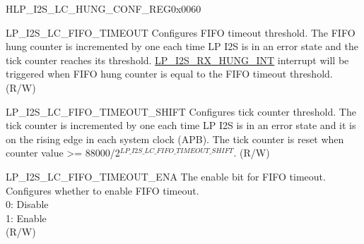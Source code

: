 \begin{register}{H}{LP\_I2S\_LC\_HUNG\_CONF\_REG}{0x0060}\label{regdesc:LPI2SLCHUNGCONFREG}
%
%
%
%
\regnewline%
\begin{regdesc}\begin{reglist}
\label{fielddesc:LPI2SLCFIFOTIMEOUT}\item[LP\_I2S\_LC\_FIFO\_TIMEOUT] Configures FIFO timeout threshold. The FIFO hung counter is incremented by one each time LP I2S is in an error state and the tick counter reaches its threshold. \hyperref[int:LPI2SRXHUNGINT]{LP\_I2S\_RX\_HUNG\_INT} interrupt will be triggered when FIFO hung counter is equal to the FIFO timeout threshold. (R/W)
\label{fielddesc:LPI2SLCFIFOTIMEOUTSHIFT}\item[LP\_I2S\_LC\_FIFO\_TIMEOUT\_SHIFT] Configures tick counter threshold. The tick counter is incremented by one each time LP I2S is in an error state and it is on the rising edge in each system clock (APB). The tick counter is reset when counter value >= 88000/2$^{LP\_I2S\_LC\_FIFO\_TIMEOUT\_SHIFT}$. (R/W)
\label{fielddesc:LPI2SLCFIFOTIMEOUTENA}\item[LP\_I2S\_LC\_FIFO\_TIMEOUT\_ENA] The enable bit for FIFO timeout. Configures whether to enable FIFO timeout. \\
0: Disable\\
1: Enable\\
(R/W)
\end{reglist}\end{regdesc}
\end{register}


